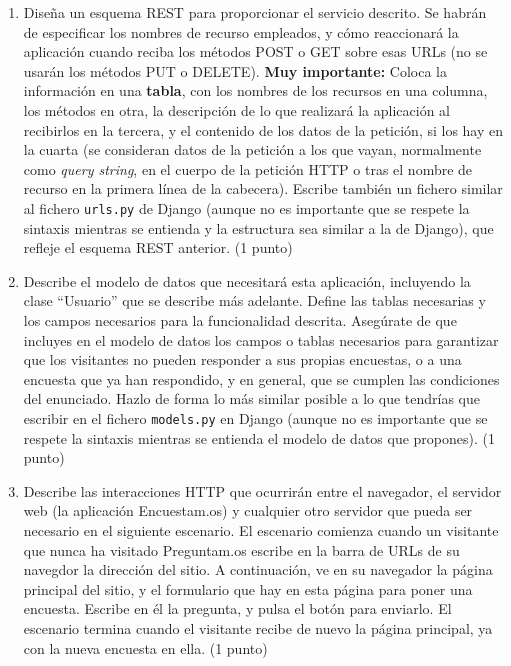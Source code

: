 \begin{enumerate}
\item Diseña un esquema REST para proporcionar el servicio descrito. Se habrán de especificar los nombres de recurso empleados, y cómo reaccionará la aplicación cuando reciba los métodos POST o GET sobre esas URLs (no se usarán los métodos PUT o DELETE). \textbf{Muy importante:} Coloca la información en una \textbf{tabla}, con los nombres de los recursos en una columna, los métodos en otra, la descripción de lo que realizará la aplicación al recibirlos en la tercera, y el contenido de los datos de la petición, si los hay en la cuarta (se consideran datos de la petición a los que vayan, normalmente como \emph{query string}, en el cuerpo de la petición HTTP o tras el nombre de recurso en la primera línea de la cabecera). Escribe también un fichero similar al fichero \texttt{urls.py} de Django (aunque no es importante que se respete la sintaxis mientras se entienda y la estructura sea similar a la de Django), que refleje el esquema REST anterior. (1 punto)

\item Describe el modelo de datos que necesitará esta aplicación, incluyendo la clase ``Usuario'' que se describe más adelante. Define las tablas necesarias y los campos necesarios para la funcionalidad descrita. Asegúrate de que incluyes en el modelo de datos los campos o tablas necesarios para garantizar que los visitantes no pueden responder a sus propias encuestas, o a una encuesta que ya han respondido, y en general, que se cumplen las condiciones del enunciado. Hazlo de forma lo más similar posible a lo que tendrías que escribir en el fichero \texttt{models.py} en Django (aunque no es importante que se respete la sintaxis mientras se entienda el modelo de datos que propones). (1 punto)
  
\item Describe las interacciones HTTP que ocurrirán entre el navegador, el servidor web (la aplicación Encuestam.os) y cualquier otro servidor que pueda ser necesario en el siguiente escenario. El escenario comienza cuando un visitante que nunca ha visitado Preguntam.os escribe en la barra de URLs de su navegdor la dirección del sitio. A continuación, ve en su navegador la página principal del sitio, y el formulario que hay en esta página para poner una encuesta. Escribe en él la pregunta, y pulsa el botón para enviarlo. El escenario termina cuando el visitante recibe de nuevo la página principal, ya con la nueva encuesta en ella. (1 punto)


\end{enumerate}
